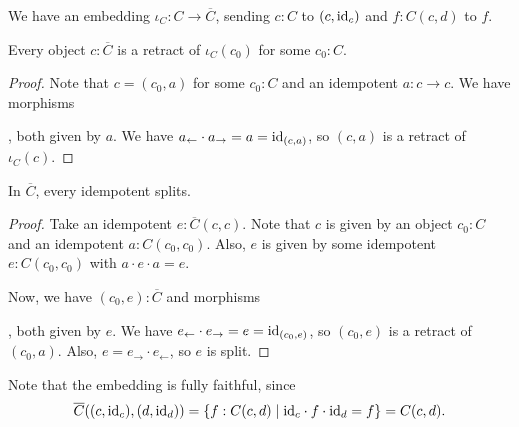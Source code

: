 \begin{definition}
  We have an embedding $ \iota_C: C \to \overline C $, sending $ c: C $ to $ (c, \text{id}_{c}) $ and $ f: C(c, d) $ to $ f $.
\end{definition}

\begin{lemma}\label{lem:karoubi-is-retract}
  Every object $ c: \overline C $ is a retract of $ \iota_C(c_0) $ for some $ c_0: C $.
\end{lemma}
\begin{proof}
  Note that $ c = (c_0, a) $ for some $ c_0: C $ and an idempotent $ a: c \to c $. We have morphisms
  , both given by $ a $. We have $ a_\leftarrow \cdot a_\rightarrow = a = \text{id}_{(c, a)} $, so $ (c, a) $ is a retract of $ \iota_C(c) $.
\end{proof}

\begin{lemma}
  In $ \overline C $, every idempotent splits.
\end{lemma}
\begin{proof}
  Take an idempotent $ e: \overline C(c, c) $. Note that $ c $ is given by an object $ c_0: C $ and an idempotent $ a: C(c_0, c_0) $. Also, $ e $ is given by some idempotent $ e: C(c_0, c_0) $ with $ a \cdot e \cdot a = e $.

  Now, we have $ (c_0, e): \overline C $ and morphisms
  , both given by $ e $. We have $ e_\leftarrow \cdot e_\rightarrow = e = \text{id}_{(c_0, e)} $, so $ (c_0, e) $ is a retract of $ (c_0, a) $. Also, $ e = e_\rightarrow \cdot e_\leftarrow $, so $ e $ is split.
\end{proof}

\begin{remark}
  Note that the embedding is fully faithful, since
  \[ \overline C((c, \text{id}_{c}), (d, \text{id}_{d})) = \{ f: C(c, d) \mid \text{id}_{c} \cdot f \cdot \text{id}_{d} = f \} = C(c, d). \]
\end{remark}

